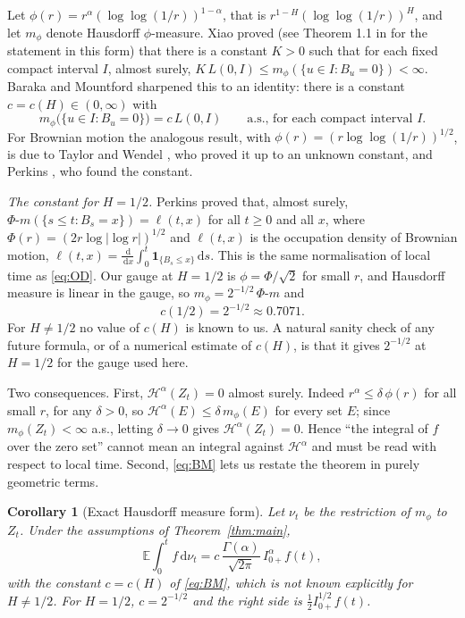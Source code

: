 \documentclass[11pt]{article}
\newtheorem{corollary}[theorem]{Corollary}
\theoremstyle{remark}
\theoremstyle{definition}
\newcommand{\E}{\mathbb{E}}
\newcommand{\dd}{\,\mathrm{d}}
\newcommand{\Ia}{I^{\alpha}_{0+}}
\begin{document}
Let $\phi(r)=r^{\alpha}(\log\log(1/r))^{1-\alpha}$, that is $r^{1-H}(\log\log(1/r))^{H}$, and let $m_\phi$ denote Hausdorff $\phi$-measure. Xiao \cite{Xia97} proved (see Theorem 1.1 in \cite{BM11} for the statement in this form) that there is a constant $K>0$ such that for each fixed compact interval $I$, almost surely, $K\,L(0,I)\le m_\phi(\{u\in I:B_u=0\})<\infty$. Baraka and Mountford \cite{BM11} sharpened this to an identity: there is a constant $c=c(H)\in(0,\infty)$ with
\begin{equation}\label{eq:BM}
m_\phi\big(\{u\in I:B_u=0\}\big)=c\,L(0,I)\qquad\text{a.s., for each compact interval } I .
\end{equation}
For Brownian motion the analogous result, with $\phi(r)=(r\log\log(1/r))^{1/2}$, is due to Taylor and Wendel \cite{TW66}, who proved it up to an unknown constant, and Perkins \cite{Per81}, who found the constant.

\emph{The constant for $H=1/2$.} Perkins \cite{Per81} proved that, almost surely, $\Phi\text{-}m(\{s\le t:B_s=x\})=\ell(t,x)$ for all $t\ge0$ and all $x$, where $\Phi(r)=(2r\log|\log r|)^{1/2}$ and $\ell(t,x)$ is the occupation density of Brownian motion, $\ell(t,x)=\frac{\dd}{\dd x}\int_0^t\mathbf 1_{\{B_s\le x\}}\dd s$. This is the same normalisation of local time as \eqref{eq:OD}. Our gauge at $H=1/2$ is $\phi=\Phi/\sqrt2$ for small $r$, and Hausdorff measure is linear in the gauge, so $m_\phi=2^{-1/2}\,\Phi\text{-}m$ and
\[
c(1/2)=2^{-1/2}\approx0.7071 .
\]
For $H\neq1/2$ no value of $c(H)$ is known to us. A natural sanity check of any future formula, or of a numerical estimate of $c(H)$, is that it gives $2^{-1/2}$ at $H=1/2$ for the gauge used here.

Two consequences. First, $\mathcal H^\alpha(Z_t)=0$ almost surely. Indeed $r^\alpha\le\delta\,\phi(r)$ for all small $r$, for any $\delta>0$, so $\mathcal H^\alpha(E)\le\delta\,m_\phi(E)$ for every set $E$; since $m_\phi(Z_t)<\infty$ a.s., letting $\delta\to0$ gives $\mathcal H^\alpha(Z_t)=0$. Hence ``the integral of $f$ over the zero set'' cannot mean an integral against $\mathcal H^\alpha$ and must be read with respect to local time. Second, \eqref{eq:BM} lets us restate the theorem in purely geometric terms.

\begin{corollary}[Exact Hausdorff measure form]\label{cor:hausdorff}
Let $\nu_t$ be the restriction of $m_\phi$ to $Z_t$. Under the assumptions of Theorem~\ref{thm:main},
\[
\E\int_0^t f\dd\nu_t=c\,\frac{\Gamma(\alpha)}{\sqrt{2\pi}}\,\Ia f(t),
\]
with the constant $c=c(H)$ of \eqref{eq:BM}, which is not known explicitly for $H\neq1/2$. For $H=1/2$, $c=2^{-1/2}$ and the right side is $\tfrac12 I^{1/2}_{0+}f(t)$.
\end{corollary}
\end{document}
